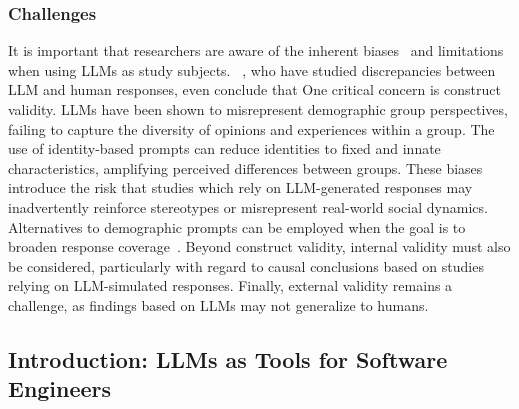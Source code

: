 \subsubsection{Challenges}

It is important that researchers are aware of the inherent biases~\cite{Crowell2023} and limitations~\cite{DBLP:journals/ais/HardingDLL24, DBLP:journals/corr/abs-2402-01908} when using LLMs as study subjects. 
\citeauthor{schroeder2025llmspsychology}~\cite{schroeder2025llmspsychology}, who have studied discrepancies between LLM and human responses, even conclude that 
One critical concern is construct validity.
LLMs have been shown to misrepresent demographic group perspectives, failing to capture the diversity of opinions and experiences within a group.
The use of identity-based prompts can reduce identities to fixed and innate characteristics, amplifying perceived differences between groups.
These biases introduce the risk that studies which rely on LLM-generated responses may inadvertently reinforce stereotypes or misrepresent real-world social dynamics.
Alternatives to demographic prompts can be employed when the goal is to broaden response coverage~\cite{DBLP:journals/corr/abs-2402-01908}.
Beyond construct validity, internal validity must also be considered, particularly with regard to causal conclusions based on studies relying on LLM-simulated responses.
Finally, external validity remains a challenge, as findings based on LLMs may not generalize to humans.


\subsection{Introduction: LLMs as Tools for Software Engineers}
\label{sec:llms-as-tools-for-software-engineers}

